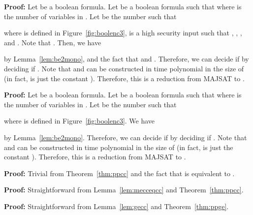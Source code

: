 \documentclass{llncs}
\newenvironment{proof}{\noindent\rm{\bf Proof:}}{\hbox{}\vspace*{0.2\baselineskip}}
\newenvironment{reftheorem}[1]{\begin{trivlist}\item[\hskip
      \labelsep{\bf Theorem #1.}]\it}{\end{trivlist}}
\begin{document}
\begin{reftheorem}{\ref{thm:ppbe1}}

\end{reftheorem}
\begin{proof}
Let  be a boolean formula.  Let  be a boolean formula such that  where  is the number of variables in .  Let  be the number such that

where  is defined in Figure~\ref{fig:boolenc3},  is a high
security input such that , ,
, and .  Note that
.  Then, we have

by Lemma~\ref{lem:be2mono}, and the fact that  and
.  Therefore, we can decide if
 by deciding if .  Note that  and  can be
constructed in time polynomial in the size of  (in fact,  is
just the constant ).  Therefore, this is a reduction from
\textrm{MAJSAT} to .
\end{proof}

\begin{reftheorem}{\ref{thm:ppbe2}}

\end{reftheorem}
\begin{proof}
Let  be a boolean formula.  Let  be a boolean formula such that  where  is the number of variables in .  Let  be the number such that

where  is defined in Figure~\ref{fig:boolenc3}.  We have

by Lemma~\ref{lem:be2mono}.  Therefore, we can decide if
 by deciding if .  Note that  and  can be
constructed in time polynomial in the size of  (in fact,  is
just the constant ).  Therefore, this is a reduction from
\textrm{MAJSAT} to .
\end{proof}

\begin{reftheorem}{\ref{thm:ppsecc}}
  
\end{reftheorem}
\begin{proof}
  Trivial from Theorem~\ref{thm:ppcc} and the fact that 
  is equivalent to .
\end{proof}

\begin{reftheorem}{\ref{thm:ppmecc}}
  
\end{reftheorem}
\begin{proof}
Straightforward from Lemma~\ref{lem:mecceqcc} and Theorem~\ref{thm:ppcc}.
\end{proof}

\begin{reftheorem}{\ref{thm:ppgecc}}
  
\end{reftheorem}
\begin{proof}
Straightforward from Lemma~\ref{lem:gecc} and Theorem~\ref{thm:ppge}.
\end{proof}
\end{document}
